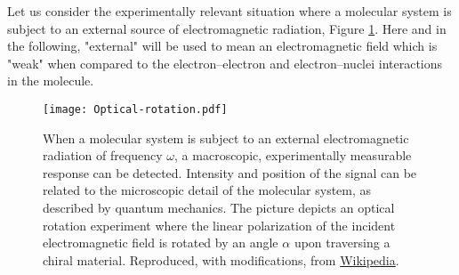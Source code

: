 Let us consider the experimentally relevant situation where a molecular
system is subject to an external source of electromagnetic radiation,
Figure \ref{fig:OR}.
Here and in the following, "external" will be used to mean an
electromagnetic field which is "weak" when compared to the
electron--electron and electron--nuclei interactions in the molecule.

\begin{figure}[tb]
  \centering
  \texttt{[image: Optical-rotation.pdf]}
  \caption{
  When a molecular system is subject to an external electromagnetic
  radiation of frequency $\omega$, a macroscopic, experimentally
  measurable response can be detected.
  Intensity and position of the signal can be related to the microscopic
  detail of the molecular system, as described by quantum mechanics.
  The picture depicts an optical rotation experiment where
  the linear polarization of the incident electromagnetic field
  is rotated by an angle $\alpha$ upon traversing a chiral material.
  Reproduced, with modifications, from \href{https://commons.wikimedia.org/wiki/File:Optical-rotation.svg}{Wikipedia}.
  }
  \label{fig:OR}
\end{figure}

